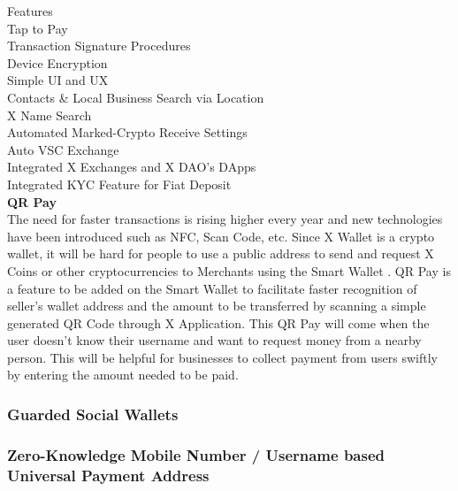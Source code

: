 \documentclass[letterpaper,11pt]{article}
\begin{document}
Features\\

Tap to Pay\\

Transaction Signature Procedures\\

Device Encryption\\

Simple UI and UX\\

Contacts \& Local Business Search via Location\\

X Name Search\\

Automated Marked-Crypto Receive Settings\\

Auto VSC Exchange\\

Integrated X Exchanges and X DAO's DApps\\

Integrated KYC Feature for Fiat Deposit\\

\textbf{QR Pay}\\

The need for faster transactions is rising higher every year and new technologies have been introduced such as NFC, Scan Code, etc. Since X Wallet is a crypto wallet, it will be hard for people to use a public address to send and request X Coins or other cryptocurrencies to Merchants using the Smart Wallet . QR Pay is a feature to be added on the Smart Wallet to facilitate faster recognition of seller’s wallet address and the amount to be transferred by scanning a simple generated QR Code through X Application. This QR Pay will come when the user doesn’t know their username and want to request money from a nearby person. This will be helpful for businesses to collect payment from users swiftly by entering the amount needed to be paid.\\
	
		\subsubsection{Guarded Social Wallets}
	
		\subsubsection{Zero-Knowledge Mobile Number / Username based Universal Payment Address}
	
\end{document}
